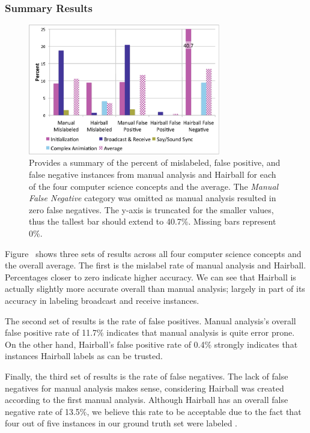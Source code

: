 \subsubsection{Summary Results}
\begin{figure}[!t]
\centering \includegraphics[trim=.3in .15in .3in .15in, clip,
  width=3.3in]{graphs/AutoSummary.eps}
\caption{Provides a summary of the percent of mislabeled, false positive, and
  false negative instances from manual analysis and Hairball for each of the
  four computer science concepts and the average. The \emph{Manual False
    Negative} category was omitted as manual analysis resulted in zero false
  negatives. The y-axis is truncated for the smaller values, thus the tallest
  bar should extend to 40.7\%. Missing bars represent 0\%.}
\end{figure}

Figure~ shows three sets of results across all four
computer science concepts and the overall average. The first is the mislabel
rate of manual analysis and Hairball. Percentages closer to zero indicate
higher accuracy. We can see that Hairball is actually slightly more accurate
overall than manual analysis; largely in part of its accuracy in labeling
broadcast and receive instances.

The second set of results is the rate of false positives. Manual analysis's
overall false positive rate of 11.7\% indicates that manual analysis is quite
error prone. On the other hand, Hairball's false positive rate of 0.4\%
strongly indicates that instances Hairball labels as \correct{} can be trusted.

Finally, the third set of results is the rate of false negatives. The lack of
false negatives for manual analysis makes sense, considering Hairball was
created according to the first manual analysis. Although Hairball has an
overall false negative rate of 13.5\%, we believe this rate to be acceptable
due to the fact that four out of five instances in our ground truth set were
labeled \correct{}.
